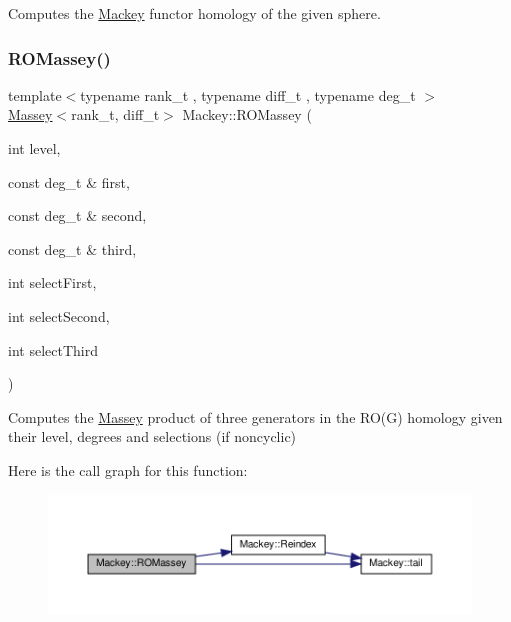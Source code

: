 Computes the \hyperlink{namespaceMackey}{Mackey} functor homology of the given sphere. 

\mbox{\label{namespaceMackey_ab75d7bcfa2d92d01bea0d5eef9f48398}} 
\subsubsection{\texorpdfstring{R\+O\+Massey()}{ROMassey()}\hspace{0.1cm}{\footnotesize\ttfamily [1/2]}}
{\footnotesize\ttfamily template$<$typename rank\+\_\+t , typename diff\+\_\+t , typename deg\+\_\+t $>$ \\
\hyperlink{classMackey_1_1Massey}{Massey}$<$rank\+\_\+t, diff\+\_\+t$>$ Mackey\+::\+R\+O\+Massey (\begin{DoxyParamCaption}\item[{int}]{level,  }\item[{const deg\+\_\+t \&}]{first,  }\item[{const deg\+\_\+t \&}]{second,  }\item[{const deg\+\_\+t \&}]{third,  }\item[{int}]{select\+First,  }\item[{int}]{select\+Second,  }\item[{int}]{select\+Third }\end{DoxyParamCaption})}



Computes the \hyperlink{classMackey_1_1Massey}{Massey} product of three generators in the R\+O(\+G) homology given their level, degrees and selections (if noncyclic) 

Here is the call graph for this function\+:\nopagebreak
\begin{figure}[H]
\begin{center}
\leavevmode
\includegraphics[width=350pt]{namespaceMackey_ab75d7bcfa2d92d01bea0d5eef9f48398_cgraph}
\end{center}
\end{figure}
\mbox{\label{namespaceMackey_a7301f53f372c1dc670b4c10f878137a2}} 

